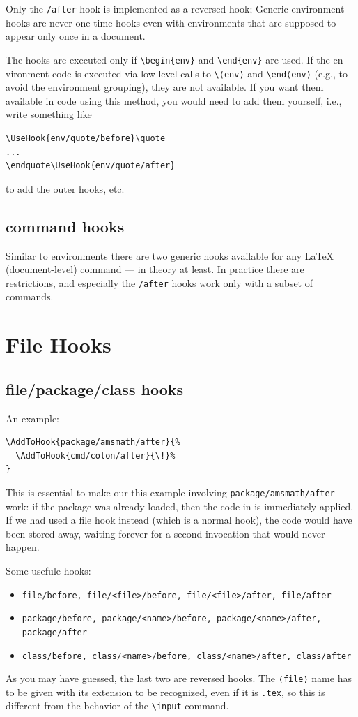 \documentclass{article}
\newcommand\tbh{\textbackslash}
\begin{document}
Only the \texttt{/after} hook is implemented as a reversed hook; Generic environment hooks are never one-time
hooks even with environments that are supposed to appear only once in a document.

The hooks are executed only if \texttt{\tbh begin\{env\}} and \texttt{\tbh end\{env\}} are used. If the en-
vironment code is executed via low-level calls to \texttt{\tbh⟨env⟩} and \texttt{\tbh end⟨env⟩} (e.g., to avoid
the environment grouping), they are not available. If you want them available in code
using this method, you would need to add them yourself, i.e., write something like
\begin{lstlisting}
\UseHook{env/quote/before}\quote
...
\endquote\UseHook{env/quote/after}
\end{lstlisting}

to add the outer hooks, etc.

\subsection{command hooks}
Similar to environments there are two generic hooks available for any \LaTeX{} (document-level) command — in theory at least. 
In practice there are restrictions, and especially the \texttt{/after} hooks work only with a subset of commands.

\section{File Hooks}
\subsection{file/package/class hooks}
An example:
\begin{lstlisting}
\AddToHook{package/amsmath/after}{%
  \AddToHook{cmd/colon/after}{\!}%
}
\end{lstlisting}
This is essential to make our this example involving \texttt{package/amsmath/after} work: if
the package was already loaded, then the code in \AddToHook is immediately applied.
If we had used a file hook instead (which is a normal hook), the code would have
been stored away, waiting forever for a second invocation that would never happen.

Some usefule hooks:
\begin{itemize}
  \item \texttt{file/before, file/<file>/before, file/<file>/after, file/after}
  \item \texttt{package/before, package/<name>/before, package/<name>/after, package/after}
  \item \texttt{class/before, class/<name>/before, class/<name>/after, class/after}
\end{itemize}
As you may have guessed, the last two
are reversed hooks. The \texttt{⟨file⟩} name has to be given with its extension to be recognized,
even if it is \texttt{.tex}, so this is different from the behavior of the \texttt{\tbh input} command.
\end{document}
